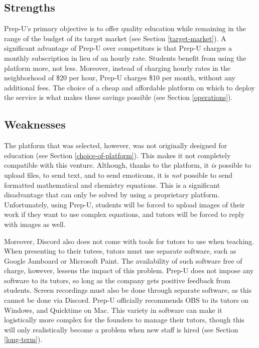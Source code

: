 \documentclass{business}
\begin{document}
    \subsection{Strengths}
    Prep-U's primary objective is to offer quality education while remaining in the range of the budget of its target market (see Section \ref{target-market}). A significant advantage of Prep-U over competitors is that Prep-U charges a monthly subscription in lieu of an hourly rate. Students benefit from using the platform more, not less. Moreover, instead of charging hourly rates in the neighborhood of \$20 per hour, Prep-U charges \$10 per month, without any additional fees. The choice of a cheap and affordable platform on which to deploy the service is what makes these savings possible (see Section \ref{operations}).
    \subsection{Weaknesses}
    The platform that was selected, however, was not originally designed for education (see Section \ref{choice-of-platform}). This makes it not completely compatible with this venture. Although, thanks to the platform, it \emph{is} possible to upload files, to send text, and to send emoticons, it is \emph{not} possible to send formatted mathematical and chemistry equations. This is a significant disadvantage that can only be solved by using a proprietary platform. Unfortunately, using Prep-U, students will be forced to upload images of their work if they want to use complex equations, and tutors will be forced to reply with images as well.\par
    Moreover, Discord also does not come with tools for tutors to use when teaching. When presenting to their tutees, tutors must use separate software, such as Google Jamboard or Microsoft Paint. The availability of such software free of charge, however, lessens the impact of this problem. Prep-U does not impose any software to its tutors, so long as the company gets positive feedback from students. Screen recordings must also be done through separate software, as this cannot be done via Discord. Prep-U officially recommends OBS to its tutors on Windows, and Quicktime on Mac. This variety in software can make it logistically more complex for the founders to manage their tutors, though this will only realistically become a problem when new staff is hired (see Section \ref{long-term}).
\end{document}
